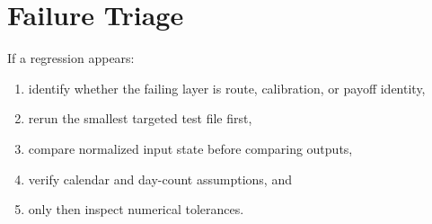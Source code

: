 \documentclass[11pt]{article}
\begin{document}
\section{Failure Triage}
If a regression appears:
\begin{enumerate}[leftmargin=1.5em]
    \item identify whether the failing layer is route, calibration, or payoff identity,
    \item rerun the smallest targeted test file first,
    \item compare normalized input state before comparing outputs,
    \item verify calendar and day-count assumptions, and
    \item only then inspect numerical tolerances.
\end{enumerate}
\end{document}
